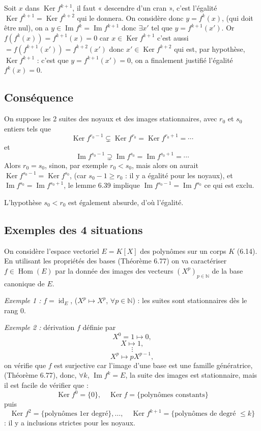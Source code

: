 Soit $x$ dans $\operatorname{Ker}f^{k+1}$, il faut « descendre d'un cran », c'est l'égalité $\operatorname{Ker}f^{k+1}=\operatorname{Ker}f^{k+2}$ qui le donnera. On considère donc $y=f^k(x)$, (qui doit être nul), on a $y\in\operatorname{Im}f^k=\operatorname{Im}f^{k+1}$ donc $\exists x'$ tel que $y=f^{k+1}(x')$. Or $f(f^k(x))=f^{k+1}(x)=0$ car $x\in\operatorname{Ker}f^{k+1}$ c'est aussi $=f(f^{k+1}(x'))=f^{k+2}(x')$ donc $x'\in\operatorname{Ker}f^{k+2}$ qui est, par hypothèse, $\operatorname{Ker}f^{k+1}$ : c'est que $y=f^{k+1}(x')=0$, on a finalement justifié l'égalité $f^k(x)=0$.

\subsection*{Conséquence}
On suppose les 2 suites des noyaux et des images stationnaires, avec $r_0$ et $s_0$ entiers tels que
\[
\operatorname{Ker}f^{r_0-1}\subsetneq\operatorname{Ker}f^{r_0}=\operatorname{Ker}f^{r_0+1}=\cdots
\]
et
\[
\operatorname{Im}f^{s_0-1}\supsetneq\operatorname{Im}f^{s_0}=\operatorname{Im}f^{s_0+1}=\cdots
\]
Alors $r_0=s_0$, sinon, par exemple $r_0<s_0$, mais alors on aurait $\operatorname{Ker}f^{s_0-1}=\operatorname{Ker}f^{s_0}$, (car $s_0-1\ge r_0$ : il y a égalité pour les noyaux), et $\operatorname{Im}f^{s_0}=\operatorname{Im}f^{s_0+1}$, le lemme 6.39 implique $\operatorname{Im}f^{s_0-1}=\operatorname{Im}f^{s_0}$ ce qui est exclu.

L'hypothèse $s_0<r_0$ est également absurde, d'où l'égalité. \bookend

\subsection*{Exemples des 4 situations}
On considère l'espace vectoriel $E=K[X]$ des polynômes sur un corps $K$ (6.14). En utilisant les propriétés des bases (Théorème 6.77) on va caractériser $f\in\operatorname{Hom}(E)$ par la donnée des images des vecteurs $(X^p)_{p\in\mathbb N}$ de la base canonique de $E$.

\textit{Exemple 1 :} $f=\operatorname{id}_E$, ($X^p\longmapsto X^p$, $\forall p\in\mathbb N$) : les suites sont stationnaires dès le rang 0.

\textit{Exemple 2 :} dérivation $f$ définie par
\[
X^0=1\longmapsto0,
\]
\[
X\longmapsto1,
\]
\[
\vdots
\]
\[
X^p\longmapsto pX^{p-1},
\]
on vérifie que $f$ est surjective car l'image d'une base est une famille génératrice, (Théorème 6.77), donc, $\forall k$, $\operatorname{Im}f^k=E$, la suite des images est stationnaire, mais il est facile de vérifier que :
\[
\operatorname{Ker}f^0=\{0\},\quad \operatorname{Ker}f=\{\text{polynômes constants}\}
\]
puis
\[
\operatorname{Ker}f^2=\{\text{polynômes 1er degré}\},\ldots,\quad \operatorname{Ker}f^{k+1}=\{\text{polynômes de degré }\le k\}
\]
: il y a inclusions strictes pour les noyaux.

